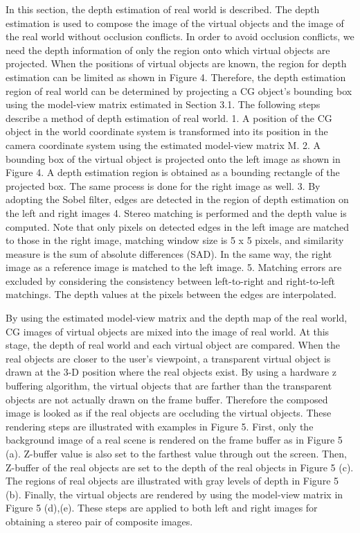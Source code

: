 In this section, the depth estimation of real world is described.
The depth estimation is used to compose the image
of the virtual objects and the image of the real world without
occlusion conflicts. In order to avoid occlusion conflicts, we
need the depth information of only the region onto which
virtual objects are projected. When the positions of virtual
objects are known, the region for depth estimation can be
limited as shown in Figure 4. Therefore, the depth estimation
region of real world can be determined by projecting
a CG object’s bounding box using the model-view matrix
estimated in Section 3.1. The following steps describe a
method of depth estimation of real world.
1. A position of the CG object in the world coordinate
system is transformed into its position in the camera
coordinate system using the estimated model-view matrix
M.
2. A bounding box of the virtual object is projected onto
the left image as shown in Figure 4. A depth estimation
region is obtained as a bounding rectangle of the
projected box. The same process is done for the right
image as well.
3. By adopting the Sobel filter, edges are detected in the
region of depth estimation on the left and right images
4. Stereo matching is performed and the depth value is
computed. Note that only pixels on detected edges in
the left image are matched to those in the right image,
matching window size is 5 x 5 pixels, and similarity
measure is the sum of absolute differences (SAD). In
the same way, the right image as a reference image is
matched to the left image.
5. Matching errors are excluded by considering the consistency
between left-to-right and right-to-left matchings.
The depth values at the pixels between the edges
are interpolated.

By using the estimated model-view matrix and the depth
map of the real world, CG images of virtual objects are
mixed into the image of real world. At this stage, the depth
of real world and each virtual object are compared. When
the real objects are closer to the user’s viewpoint, a transparent
virtual object is drawn at the 3-D position where the
real objects exist. By using a hardware z buffering algorithm,
the virtual objects that are farther than the transparent
objects are not actually drawn on the frame buffer. Therefore
the composed image is looked as if the real objects are
occluding the virtual objects. These rendering steps are illustrated
with examples in Figure 5.
First, only the background image of a real scene is rendered
on the frame buffer as in Figure 5 (a). Z-buffer value
is also set to the farthest value through out the screen. Then,
Z-buffer of the real objects are set to the depth of the real
objects in Figure 5 (c). The regions of real objects are illustrated
with gray levels of depth in Figure 5 (b). Finally, the
virtual objects are rendered by using the model-view matrix
in Figure 5 (d),(e). These steps are applied to both left and right images for obtaining a stereo pair of composite
images.

